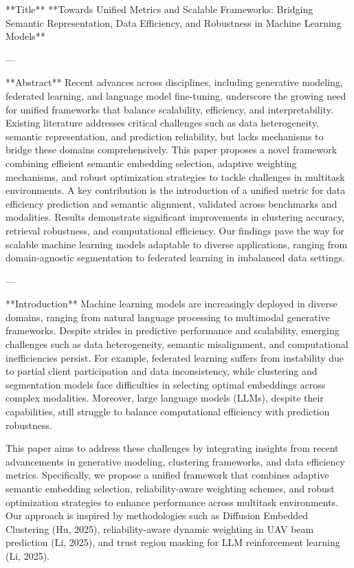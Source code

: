 **Title**  
**Towards Unified Metrics and Scalable Frameworks: Bridging Semantic Representation, Data Efficiency, and Robustness in Machine Learning Models**

---

**Abstract**  
Recent advances across disciplines, including generative modeling, federated learning, and language model fine-tuning, underscore the growing need for unified frameworks that balance scalability, efficiency, and interpretability. Existing literature addresses critical challenges such as data heterogeneity, semantic representation, and prediction reliability, but lacks mechanisms to bridge these domains comprehensively. This paper proposes a novel framework combining efficient semantic embedding selection, adaptive weighting mechanisms, and robust optimization strategies to tackle challenges in multitask environments. A key contribution is the introduction of a unified metric for data efficiency prediction and semantic alignment, validated across benchmarks and modalities. Results demonstrate significant improvements in clustering accuracy, retrieval robustness, and computational efficiency. Our findings pave the way for scalable machine learning models adaptable to diverse applications, ranging from domain-agnostic segmentation to federated learning in imbalanced data settings.

---

**Introduction**  
Machine learning models are increasingly deployed in diverse domains, ranging from natural language processing to multimodal generative frameworks. Despite strides in predictive performance and scalability, emerging challenges such as data heterogeneity, semantic misalignment, and computational inefficiencies persist. For example, federated learning suffers from instability due to partial client participation and data inconsistency, while clustering and segmentation models face difficulties in selecting optimal embeddings across complex modalities. Moreover, large language models (LLMs), despite their capabilities, still struggle to balance computational efficiency with prediction robustness.

This paper aims to address these challenges by integrating insights from recent advancements in generative modeling, clustering frameworks, and data efficiency metrics. Specifically, we propose a unified framework that combines adaptive semantic embedding selection, reliability-aware weighting schemes, and robust optimization strategies to enhance performance across multitask environments. Our approach is inspired by methodologies such as Diffusion Embedded Clustering (Hu, 2025), reliability-aware dynamic weighting in UAV beam prediction (Li, 2025), and trust region masking for LLM reinforcement learning (Li, 2025).

